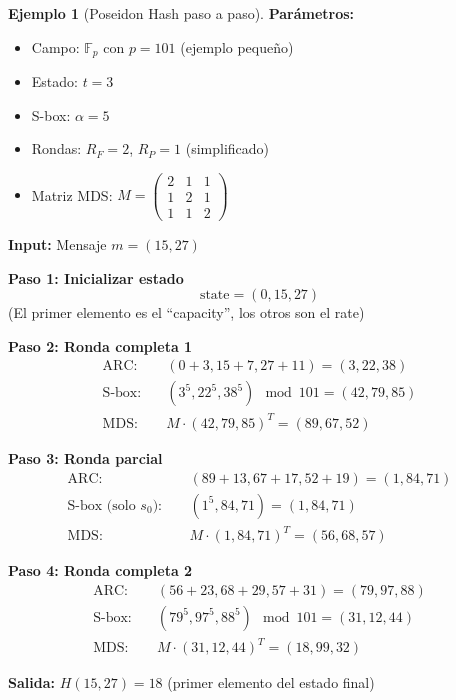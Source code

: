 \documentclass[11pt,a4paper,twoside,openright]{book}
\theoremstyle{definition}
\newtheorem{example}{Ejemplo}[chapter]
\theoremstyle{plain}
\theoremstyle{remark}
\newcommand{\F}{\mathbb{F}}
\begin{document}
\begin{example}[Poseidon Hash paso a paso]
\textbf{Parámetros:}
\begin{itemize}
    \item Campo: $\F_p$ con $p = 101$ (ejemplo pequeño)
    \item Estado: $t = 3$
    \item S-box: $\alpha = 5$
    \item Rondas: $R_F = 2$, $R_P = 1$ (simplificado)
    \item Matriz MDS: $M = \begin{pmatrix} 2 & 1 & 1 \\ 1 & 2 & 1 \\ 1 & 1 & 2 \end{pmatrix}$
\end{itemize}

\textbf{Input:} Mensaje $m = (15, 27)$

\textbf{Paso 1: Inicializar estado}
\[ \text{state} = (0, 15, 27) \]
(El primer elemento es el ``capacity'', los otros son el rate)

\textbf{Paso 2: Ronda completa 1}
\begin{align}
\text{ARC}: \quad &(0 + 3, 15 + 7, 27 + 11) = (3, 22, 38) \\
\text{S-box}: \quad &(3^5, 22^5, 38^5) \mod 101 = (42, 79, 85) \\
\text{MDS}: \quad &M \cdot (42, 79, 85)^T = (89, 67, 52)
\end{align}

\textbf{Paso 3: Ronda parcial}
\begin{align}
\text{ARC}: \quad &(89 + 13, 67 + 17, 52 + 19) = (1, 84, 71) \\
\text{S-box (solo } s_0): \quad &(1^5, 84, 71) = (1, 84, 71) \\
\text{MDS}: \quad &M \cdot (1, 84, 71)^T = (56, 68, 57)
\end{align}

\textbf{Paso 4: Ronda completa 2}
\begin{align}
\text{ARC}: \quad &(56 + 23, 68 + 29, 57 + 31) = (79, 97, 88) \\
\text{S-box}: \quad &(79^5, 97^5, 88^5) \mod 101 = (31, 12, 44) \\
\text{MDS}: \quad &M \cdot (31, 12, 44)^T = (18, 99, 32)
\end{align}

\textbf{Salida:} $H(15, 27) = 18$ (primer elemento del estado final)
\end{example}
\end{document}
